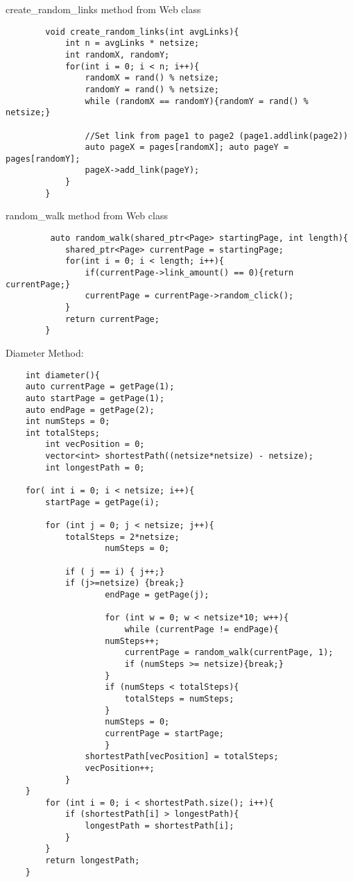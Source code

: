 \documentclass{article}
\begin{document}
\begin{enumerate}[label={[\arabic*]}]
\item create\_random\_links method from Web class
\begin{lstlisting}
        void create_random_links(int avgLinks){
            int n = avgLinks * netsize;
            int randomX, randomY;
            for(int i = 0; i < n; i++){
                randomX = rand() % netsize;
                randomY = rand() % netsize;
                while (randomX == randomY){randomY = rand() % netsize;}
                
                //Set link from page1 to page2 (page1.addlink(page2))
                auto pageX = pages[randomX]; auto pageY = pages[randomY];
                pageX->add_link(pageY);
            }
        }
\end{lstlisting}

\item random\_walk method from Web class
 \begin{lstlisting}
         auto random_walk(shared_ptr<Page> startingPage, int length){
            shared_ptr<Page> currentPage = startingPage;
            for(int i = 0; i < length; i++){
                if(currentPage->link_amount() == 0){return currentPage;}
                currentPage = currentPage->random_click();
            }
            return currentPage;
        }
\end{lstlisting}

\item Diameter Method:
\begin{lstlisting}
    int diameter(){
	auto currentPage = getPage(1);
	auto startPage = getPage(1);
	auto endPage = getPage(2);
	int numSteps = 0;
	int totalSteps;
        int vecPosition = 0;
        vector<int> shortestPath((netsize*netsize) - netsize); 
        int longestPath = 0;

	for( int i = 0; i < netsize; i++){
		startPage = getPage(i);		
		
		for (int j = 0; j < netsize; j++){
		    totalSteps = 2*netsize;
                    numSteps = 0;
   
		    if ( j == i) { j++;}
		    if (j>=netsize) {break;}
                    endPage = getPage(j);	
                    
                    for (int w = 0; w < netsize*10; w++){ 
                        while (currentPage != endPage){
 	                numSteps++;
                        currentPage = random_walk(currentPage, 1);
                        if (numSteps >= netsize){break;}
                    }
                    if (numSteps < totalSteps){
                        totalSteps = numSteps;
                    }
                    numSteps = 0;
                    currentPage = startPage;
                    }
                shortestPath[vecPosition] = totalSteps;
                vecPosition++;
            }
	}
        for (int i = 0; i < shortestPath.size(); i++){ 
            if (shortestPath[i] > longestPath){
                longestPath = shortestPath[i];
            }
        }
        return longestPath;
	}


\end{lstlisting}
\end{enumerate}
\end{document}
